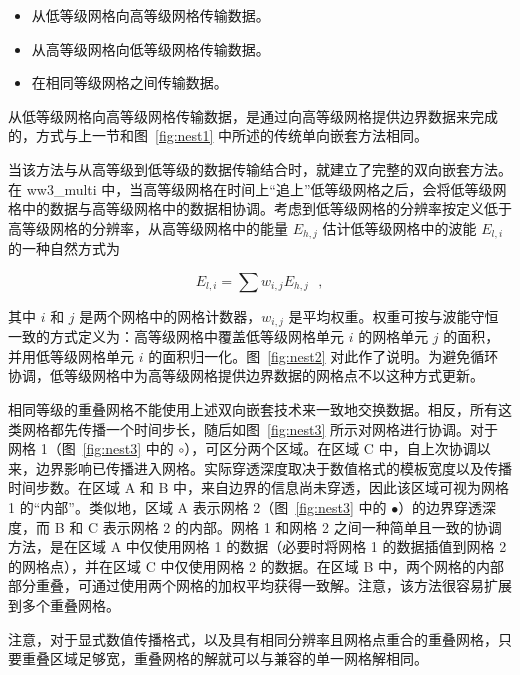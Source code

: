 \begin{itemize}
\item 从低等级网格向高等级网格传输数据。
\item 从高等级网格向低等级网格传输数据。
\item 在相同等级网格之间传输数据。
\end{itemize}

从低等级网格向高等级网格传输数据，是通过向高等级网格提供边界数据来完成的，方式与上一节和图~\ref{fig:nest1} 中所述的传统单向嵌套方法相同。



当该方法与从高等级到低等级的数据传输结合时，就建立了完整的双向嵌套方法。在 {\file ww3\_multi} 中，当高等级网格在时间上“追上”低等级网格之后，会将低等级网格中的数据与高等级网格中的数据相协调。考虑到低等级网格的分辨率按定义低于高等级网格的分辨率，从高等级网格中的能量 $E_{h,j}$ 估计低等级网格中的波能 $E_{l,i}$ 的一种自然方式为

\begin{equation}
E_{l,i} = \sum w_{i,j} E_{h,j} \:\:\: , \label{eq:nest_hg1}
\end{equation}

\noindent
其中 $i$ 和 $j$ 是两个网格中的网格计数器，$w_{i,j}$ 是平均权重。权重可按与波能守恒一致的方式定义为：高等级网格中覆盖低等级网格单元 $i$ 的网格单元 $j$ 的面积，并用低等级网格单元 $i$ 的面积归一化。图~\ref{fig:nest2} 对此作了说明。为避免循环协调，低等级网格中为高等级网格提供边界数据的网格点不以这种方式更新。



相同等级的重叠网格不能使用上述双向嵌套技术来一致地交换数据。相反，所有这类网格都先传播一个时间步长，随后如图~\ref{fig:nest3} 所示对网格进行协调。对于网格 1（图~\ref{fig:nest3} 中的 $\circ$），可区分两个区域。在区域 C 中，自上次协调以来，边界影响已传播进入网格。实际穿透深度取决于数值格式的模板宽度以及传播时间步数。在区域 A 和 B 中，来自边界的信息尚未穿透，因此该区域可视为网格 1 的“内部”。类似地，区域 A 表示网格 2（图~\ref{fig:nest3} 中的 $\bullet$）的边界穿透深度，而 B 和 C 表示网格 2 的内部。网格 1 和网格 2 之间一种简单且一致的协调方法，是在区域 A 中仅使用网格 1 的数据（必要时将网格 1 的数据插值到网格 2 的网格点），并在区域 C 中仅使用网格 2 的数据。在区域 B 中，两个网格的内部部分重叠，可通过使用两个网格的加权平均获得一致解。注意，该方法很容易扩展到多个重叠网格。

注意，对于显式数值传播格式，以及具有相同分辨率且网格点重合的重叠网格，只要重叠区域足够宽，重叠网格的解就可以与兼容的单一网格解相同。


